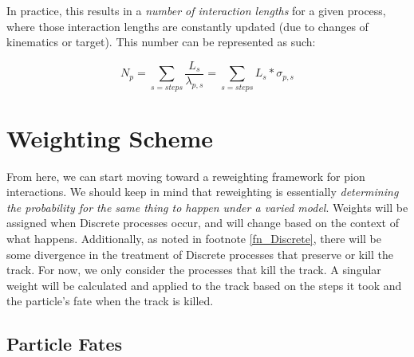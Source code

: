 \documentclass[12pt]{article}
\begin{document}
In practice, this results in a \textit{number of interaction lengths} for a given process, where those interaction lengths are constantly updated (due to changes of kinematics or target). This number can be represented as such:

\begin{equation}\label{eq:Nint}
N_p = \sum\limits_{s=steps} \frac{L_s}{\lambda_{p,s}} = \sum\limits_{s=steps} L_s * \sigma_{p,s}
\end{equation}





\section{Weighting Scheme}
From here, we can start moving toward a reweighting framework for pion interactions. We should keep in mind that reweighting is essentially \textit{determining the probability for the same thing to happen under a varied model}. Weights will be assigned when Discrete processes occur, and will change based on the context of what happens. Additionally, as noted in footnote \ref{fn_Discrete}, there will be some divergence in the treatment of Discrete processes that preserve or kill the track. For now, we only consider the processes that kill the track. A singular weight   will be calculated and applied to the track based on the steps it took and the particle's fate when the track is killed.

\subsection{Particle Fates}
\end{document}
